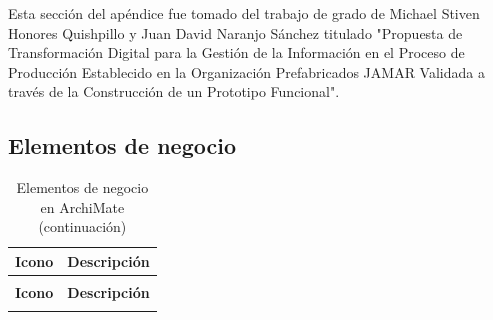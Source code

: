 Esta sección del apéndice fue tomado del trabajo de grado de Michael Stiven Honores Quishpillo y Juan David Naranjo Sánchez titulado "Propuesta de Transformación Digital para la Gestión de la Información en el Proceso de Producción Establecido en la Organización Prefabricados JAMAR Validada a través de la Construcción de un Prototipo Funcional". 

\subsection{Elementos de negocio}

\begin{longtable}{|c|p{8cm}|}
\caption{Elementos de negocio en ArchiMate} \label{tab:elementos-negocio-archimate} \\
\hline
\textbf{Icono} & \textbf{Descripción} \\
\hline
\endfirsthead

\caption[]{Elementos de negocio en ArchiMate (continuación)} \\
\hline
\textbf{Icono} & \textbf{Descripción} \\
\hline
\endhead

\hline
\endfoot


\end{longtable}
